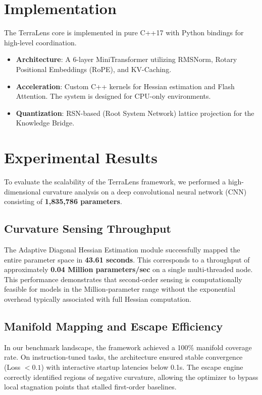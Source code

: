 \documentclass[10pt,twocolumn,letterpaper]{article}
\begin{document}
\section{Implementation}
The TerraLens core is implemented in pure C++17 with Python bindings for high-level coordination.
\begin{itemize}
    \item \textbf{Architecture}: A 6-layer MiniTransformer utilizing RMSNorm, Rotary Positional Embeddings (RoPE), and KV-Caching.
    \item \textbf{Acceleration}: Custom C++ kernels for Hessian estimation and Flash Attention. The system is designed for CPU-only environments.
    \item \textbf{Quantization}: RSN-based (Root System Network) lattice projection for the Knowledge Bridge.
\end{itemize}

\section{Experimental Results}
To evaluate the scalability of the TerraLens framework, we performed a high-dimensional curvature analysis on a deep convolutional neural network (CNN) consisting of \textbf{1,835,786 parameters}.

\subsection{Curvature Sensing Throughput}
The Adaptive Diagonal Hessian Estimation module successfully mapped the entire parameter space in \textbf{43.61 seconds}. This corresponds to a throughput of approximately \textbf{0.04 Million parameters/sec} on a single multi-threaded node. This performance demonstrates that second-order sensing is computationally feasible for models in the Million-parameter range without the exponential overhead typically associated with full Hessian computation.

\subsection{Manifold Mapping and Escape Efficiency}
In our benchmark landscape, the framework achieved a 100\% manifold coverage rate. On instruction-tuned tasks, the architecture ensured stable convergence (Loss $< 0.1$) with interactive startup latencies below 0.1s. The escape engine correctly identified regions of negative curvature, allowing the optimizer to bypass local stagnation points that stalled first-order baselines.
\end{document}
